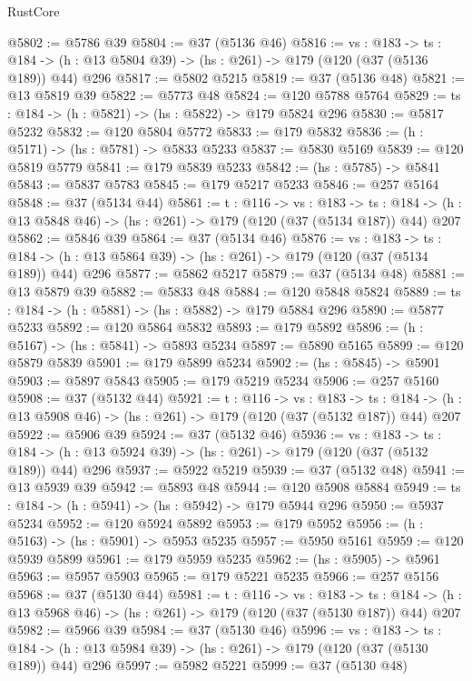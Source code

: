 \begin{lexlean}{RustCore}
\begin{coremodule}
@5802 := @5786 @39
@5804 := @37 (@5136 @46)
@5816 := {vs : @183} ->
  {ts : @184} -> (h : @13 @5804 @39) -> (hs : @261) -> @179 (@120 (@37 (@5136 @189)) @44) @296
@5817 := @5802 @5215
@5819 := @37 (@5136 @48)
@5821 := @13 @5819 @39
@5822 := @5773 @48
@5824 := @120 @5788 @5764
@5829 := {ts : @184} -> (h : @5821) -> (hs : @5822) -> @179 @5824 @296
@5830 := @5817 @5232
@5832 := @120 @5804 @5772
@5833 := @179 @5832
@5836 := (h : @5171) -> (hs : @5781) -> @5833 @5233
@5837 := @5830 @5169
@5839 := @120 @5819 @5779
@5841 := @179 @5839 @5233
@5842 := (hs : @5785) -> @5841
@5843 := @5837 @5783
@5845 := @179 @5217 @5233
@5846 := @257 @5164
@5848 := @37 (@5134 @44)
@5861 := {t : @116} ->
  {vs : @183} ->
  {ts : @184} -> (h : @13 @5848 @46) -> (hs : @261) -> @179 (@120 (@37 (@5134 @187)) @44) @207
@5862 := @5846 @39
@5864 := @37 (@5134 @46)
@5876 := {vs : @183} ->
  {ts : @184} -> (h : @13 @5864 @39) -> (hs : @261) -> @179 (@120 (@37 (@5134 @189)) @44) @296
@5877 := @5862 @5217
@5879 := @37 (@5134 @48)
@5881 := @13 @5879 @39
@5882 := @5833 @48
@5884 := @120 @5848 @5824
@5889 := {ts : @184} -> (h : @5881) -> (hs : @5882) -> @179 @5884 @296
@5890 := @5877 @5233
@5892 := @120 @5864 @5832
@5893 := @179 @5892
@5896 := (h : @5167) -> (hs : @5841) -> @5893 @5234
@5897 := @5890 @5165
@5899 := @120 @5879 @5839
@5901 := @179 @5899 @5234
@5902 := (hs : @5845) -> @5901
@5903 := @5897 @5843
@5905 := @179 @5219 @5234
@5906 := @257 @5160
@5908 := @37 (@5132 @44)
@5921 := {t : @116} ->
  {vs : @183} ->
  {ts : @184} -> (h : @13 @5908 @46) -> (hs : @261) -> @179 (@120 (@37 (@5132 @187)) @44) @207
@5922 := @5906 @39
@5924 := @37 (@5132 @46)
@5936 := {vs : @183} ->
  {ts : @184} -> (h : @13 @5924 @39) -> (hs : @261) -> @179 (@120 (@37 (@5132 @189)) @44) @296
@5937 := @5922 @5219
@5939 := @37 (@5132 @48)
@5941 := @13 @5939 @39
@5942 := @5893 @48
@5944 := @120 @5908 @5884
@5949 := {ts : @184} -> (h : @5941) -> (hs : @5942) -> @179 @5944 @296
@5950 := @5937 @5234
@5952 := @120 @5924 @5892
@5953 := @179 @5952
@5956 := (h : @5163) -> (hs : @5901) -> @5953 @5235
@5957 := @5950 @5161
@5959 := @120 @5939 @5899
@5961 := @179 @5959 @5235
@5962 := (hs : @5905) -> @5961
@5963 := @5957 @5903
@5965 := @179 @5221 @5235
@5966 := @257 @5156
@5968 := @37 (@5130 @44)
@5981 := {t : @116} ->
  {vs : @183} ->
  {ts : @184} -> (h : @13 @5968 @46) -> (hs : @261) -> @179 (@120 (@37 (@5130 @187)) @44) @207
@5982 := @5966 @39
@5984 := @37 (@5130 @46)
@5996 := {vs : @183} ->
  {ts : @184} -> (h : @13 @5984 @39) -> (hs : @261) -> @179 (@120 (@37 (@5130 @189)) @44) @296
@5997 := @5982 @5221
@5999 := @37 (@5130 @48)

\end{coremodule}
\end{lexlean}
